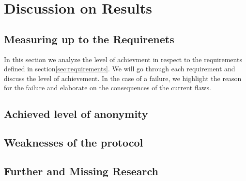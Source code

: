 \part{Discussion on Results}

\chapter{Measuring up to the Requirenets\label{sec:reqDiscussion}}
In this section we analyze the level of achievment in respect to the requirements defined in section\ref{sec:requirements}. We will go through each requirement and discuss the level of achievement. In the case of a failure, we highlight the reason for the failure and elaborate on the consequences of the current flaws.



\chapter{Achieved level of anonymity}

\chapter{Weaknesses of the protocol}

\chapter{Further and Missing Research}
